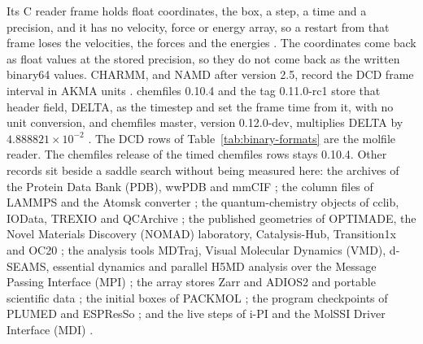 \documentclass[preprint,12pt]{elsarticle}
\begin{document}
Its C reader frame holds float coordinates, the box, a step, a time and a precision, and it has no velocity, force or energy array, so a restart from that frame loses the velocities, the forces and the energies \cite{kokotMdcompress2052026,kokotMdcompressFrame2052026}.
The coordinates come back as float values at the stored precision, so they do not come back as the written binary64 values.
CHARMM, and NAMD after version 2.5, record the DCD frame interval in AKMA units \cite{gowersMdanalysisDcd2110}.
chemfiles 0.10.4 and the tag 0.11.0-rc1 store that header field, DELTA, as the timestep and set the frame time from it, with no unit conversion, and chemfiles master, version 0.12.0-dev, multiplies DELTA by \(4.888821\times 10^{-2}\) \cite{frauxChemfilesDcd0104,frauxChemfiles0110rc12025,frauxChemfilesDcd012dev,frauxChemfilesPr5322026}.
The DCD rows of Table~\ref{tab:binary-formats} are the molfile reader.
The chemfiles release of the timed chemfiles rows stays 0.10.4.
Other records sit beside a saddle search without being measured here: the archives of the Protein Data Bank (PDB), wwPDB and mmCIF \cite{bermanProteinDataBank2000,bermanAnnouncingWorldwideProtein2003,westbrookStarmmcifOntologyMacromolecular2000}; the column files of LAMMPS and the Atomsk converter \cite{thompsonLammpsFlexibleSimulation2022,hirelAtomskToolManipulating2015}; the quantum-chemistry objects of cclib, IOData, TREXIO and QCArchive \cite{oboyleCclibLibraryPackageindependent2008,verstraelenIodataPythonLibrary2021,posenitskiyTrexioFileFormat2023,smithMolssiQcaRchive2021}; the published geometries of OPTIMADE, the Novel Materials Discovery (NOMAD) laboratory, Catalysis-Hub, Transition1x and OC20 \cite{andersenOptimadeApiExchanging2021,draxlNomadLaboratoryData2019,wintherCatalysishuborgOpenElectronic2019,schreinerTransition1xDatasetBuilding2022,chanussotOpenCatalyst20202021}; the analysis tools MDTraj, Visual Molecular Dynamics (VMD), d-SEAMS, essential dynamics and parallel H5MD analysis over the Message Passing Interface (MPI) \cite{mcgibbonMdtrajModernOpen2015,humphreyVmdVisualMolecular1996,goswamiDseamsDeferredStructural2020,meyerEssentialDynamicsTool2006,jakupovicMpiparallelMolecularDynamics2021}; the array stores Zarr and ADIOS2 and portable scientific data \cite{opengeospatialconsortiumZarrStorageSpecification2022,godoyAdios2Adaptable2020,brownSoftwarePortableScientific1993}; the initial boxes of PACKMOL \cite{martinezPackmolPackageBuilding2009}; the program checkpoints of PLUMED and ESPResSo \cite{tribelloPlumed2New2014,weikEspresso40Extensible2019}; and the live steps of i-PI and the MolSSI Driver Interface (MDI) \cite{ceriottiIpiPythonInterface2014,kapilIpi20Universal2019,litmanIpi30Flexible2024,barnesMolssiDriverInterface2021}.
\end{document}
